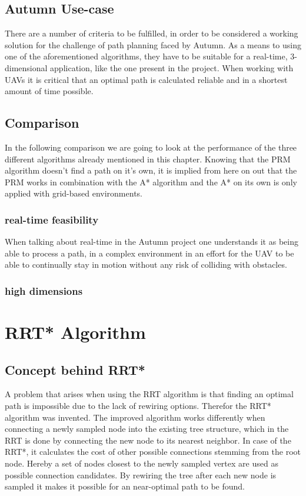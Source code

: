 \subsection{Autumn Use-case}

There are a number of criteria to be fulfilled, in order to be considered a working solution for the challenge of path planning faced by Autumn.
As a means to using one of the aforementioned algorithms, they have to be suitable for a real-time, 3-dimensional application, like the one present in the project.
When working with UAVs it is critical that an optimal path is calculated reliable and in a shortest amount of time possible. 

\subsection{Comparison}

In the following comparison we are going to look at the performance of the three different algorithms already mentioned in this chapter. Knowing that the PRM algorithm doesn't find a path on it's own, it is implied from here on out that the PRM works in combination with the A* algorithm and the A* on its own is only applied with grid-based environments.  

\subsubsection{real-time feasibility}

When talking about real-time in the Autumn project one understands it as being able to process a path, in a complex environment in an effort for the UAV to be able to continually stay in motion without any risk of colliding with obstacles. 

\subsubsection{high dimensions}

\section{RRT* Algorithm}

\subsection{Concept behind RRT*}

A problem that arises when using the RRT algorithm is that finding an optimal path is impossible due to the lack of rewiring options. Therefor the RRT* algorithm was invented. 
The improved algorithm works differently when connecting a newly sampled node into the existing tree structure, which in the RRT is done by connecting the new node to its nearest neighbor. In case of the RRT*, it calculates the cost of other possible connections stemming from the root node. Hereby a set of nodes closest to the newly sampled vertex are used as possible connection candidates. By rewiring the tree after each new node is sampled it makes it possible for an near-optimal path to be found.


